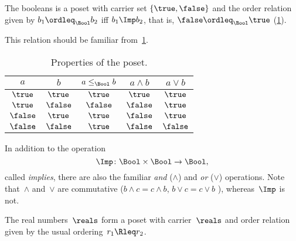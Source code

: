 \begin{example}[Booleans]
  \label{ex:bool}
  The booleans \index{\Bool} is a poset with carrier set $\{\true,\false\}$ and the order relation given by $b_1 \ordleq_\Bool b_2$ iff $b_1 \Imp b_2$, that is, $\false \ordleq_\Bool \true$ (\cref{fig:boolean}).

  \begin{figure}[h!]
    \centering
    \caption{\label{fig:boolean}}
  \end{figure}

  This relation should be familiar from~\cref{tab:boolposet}.

  \begin{table}[h!]
    \begin{center}
      \begin{tabular}{cc|ccc}
        $a$      & $b$      & $a \leq_\Bool b$ & $a \wedge b$ & $a \vee b$ \\ \hline
        $\true$  & $\true$  & $\true$          & $\true$      & $\true$    \\
        $\true$  & $\false$ & $\false$         & $\false$     & $\true$    \\
        $\false$ & $\true$  & $\true$          & $\false$     & $\true$    \\
        $\false$ & $\false$ & $\true$          & $\false$     & $\false$
      \end{tabular}
    \end{center}
    \caption{Properties of the \Bool poset. \label{tab:boolposet}}
  \end{table}

  In addition to the operation
  \begin{equation*}
    \Imp\colon\Bool\times \Bool\to\Bool,
  \end{equation*}
  called \emph{implies}, there are also the familiar \emph{and} ($\wedge$) and \emph{or} ($\vee$) operations. Note that~$\wedge$ and~$\vee$ are commutative ($b\wedge c = c\wedge b$, $b\vee c = c\vee b$ ), whereas~$\Imp$ is not.
\end{example}




\begin{example}[Reals]
  The real numbers~$\reals$ form a poset with carrier~$\reals$ and order relation given by the usual ordering~$r_1 \Rleq r_2$.
\end{example}

